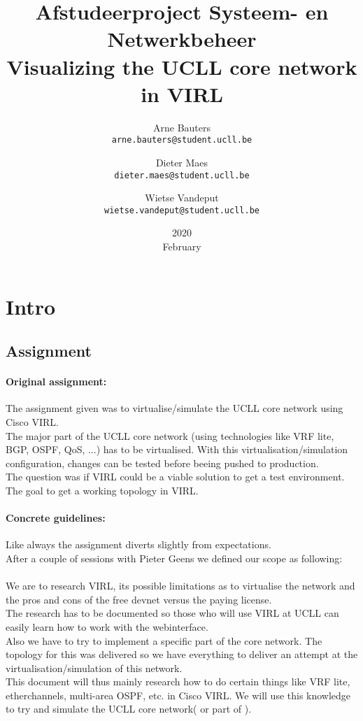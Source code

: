 \documentclass[english]{article}
\title{Afstudeerproject Systeem- en Netwerkbeheer\\
	\large Visualizing the UCLL core network in VIRL}
\date{2020\\ February}
\author{Arne Bauters\\
	\texttt{arne.bauters@student.ucll.be}
	\and 
	Dieter Maes\\
	\texttt{dieter.maes@student.ucll.be}
	\and
	Wietse Vandeput\\
	\texttt{wietse.vandeput@student.ucll.be}
}
\begin{document}
	\maketitle
	\newpage
	\tableofcontents
	\newpage
	\section{Intro}
	\subsection{Assignment}
	\paragraph{Original assignment: }
	
	The assignment given was to virtualise/simulate the UCLL core network using Cisco VIRL.\\
	The major part of the UCLL core network (using technologies like VRF lite, BGP, OSPF, QoS, ...) has to be virtualised. With this virtualisation/simulation configuration, changes can be tested before beeing pushed to production.\\
	The question was if VIRL could be a viable solution to get a test environment.\\
	The goal to get a working topology in VIRL.\\
	\paragraph{Concrete guidelines: }
	
	Like always the assignment diverts slightly from expectations.\\
	After a couple of sessions with Pieter Geens we defined our scope as following:\\
	\\
	We are to research VIRL, its possible limitations as to virtualise the network and the pros and cons of the free devnet versus the paying license.\\
	The research has to be documented so those who will use VIRL at UCLL can easily learn how to work with the webinterface.\\
	Also we have to try to implement a specific part of the core network. The topology for this was delivered so we have everything to deliver an attempt at the virtualisation/simulation of this network.\\
	This document will thus mainly research how to do certain things like VRF lite, etherchannels, multi-area OSPF, etc. in Cisco VIRL. We will use this knowledge to try and simulate the UCLL core network( or part of ).
	\newpage
	
\end{document}
